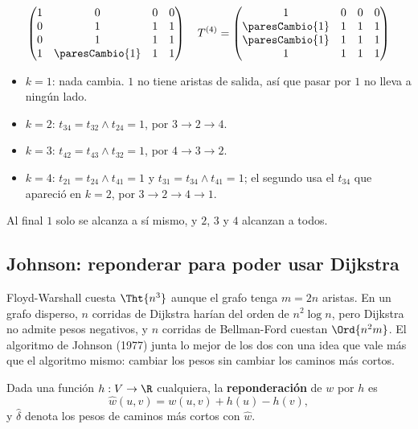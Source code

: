 \documentclass[11pt,letterpaper]{article}
\begin{document}
\begin{ejemplo}
{\[\begin{pmatrix}
    1 & 0 & 0 & 0 \\
    0 & 1 & 1 & 1 \\
    0 & 1 & 1 & 1 \\
    1 & \paresCambio{1} & 1 & 1
  \end{pmatrix}
  \quad
  T^{(4)} = \begin{pmatrix}
    1 & 0 & 0 & 0 \\
    \paresCambio{1} & 1 & 1 & 1 \\
    \paresCambio{1} & 1 & 1 & 1 \\
    1 & 1 & 1 & 1
  \end{pmatrix}
  \]
  }%
  \begin{itemize}[itemsep=0.1em]
    \item $k = 1$: nada cambia. $1$ no tiene aristas de salida, así que
          pasar por $1$ no lleva a ningún lado.
    \item $k = 2$: $t_{34} = t_{32} \land t_{24} = 1$, por
          $3 \to 2 \to 4$.
    \item $k = 3$: $t_{42} = t_{43} \land t_{32} = 1$, por
          $4 \to 3 \to 2$.
    \item $k = 4$: $t_{21} = t_{24} \land t_{41} = 1$ y
          $t_{31} = t_{34} \land t_{41} = 1$; el segundo usa el $t_{34}$
          que apareció en $k = 2$, por $3 \to 2 \to 4 \to 1$.
  \end{itemize}
  Al final $1$ solo se alcanza a sí mismo, y $2$, $3$ y $4$ alcanzan a
  todos.
\end{ejemplo}



\subsection*{Johnson: reponderar para poder usar Dijkstra}

Floyd-Warshall cuesta $\Tht{n^3}$ aunque el grafo tenga $m = 2n$
aristas. En un grafo disperso, $n$ corridas de Dijkstra harían del
orden de $n^2 \log n$, pero Dijkstra no admite pesos negativos, y $n$
corridas de Bellman-Ford cuestan $\Ord{n^2 m}$. El algoritmo de
Johnson (1977) junta lo mejor de los dos con una idea que vale más que
el algoritmo mismo: cambiar los pesos sin cambiar los caminos más
cortos.

\begin{definicion}[Reponderación]
  \label{def:reponderacion-johnson}
  Dada una función $h : V \to \R$ cualquiera, la
  \textbf{reponderación} de $w$ por $h$ es
  \[
    \hat{w}(u, v) = w(u, v) + h(u) - h(v) ,
  \]
  y $\hat{\delta}$ denota los pesos de caminos más cortos con
  $\hat{w}$.
\end{definicion}
\end{document}
